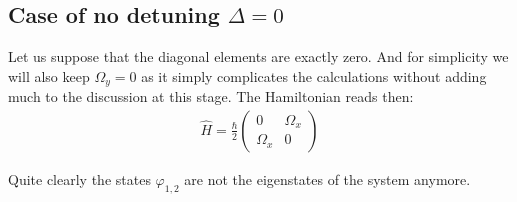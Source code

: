 \subsection{Case of no detuning $\Delta = 0$}

Let us suppose that the diagonal elements are exactly zero. And for simplicity we will also keep $\Omega_y =0$ as it simply complicates the calculations without adding much to the discussion at this stage. The Hamiltonian reads then:
\begin{align}
\hat{H} = \frac{\hbar}{2}\left( \begin{array}{cc} 0  & \Omega_x\\ \Omega_x &0 \end{array} \right)
\end{align}

Quite clearly the states $\varphi_{1,2}$ are not the eigenstates of the system anymore. 